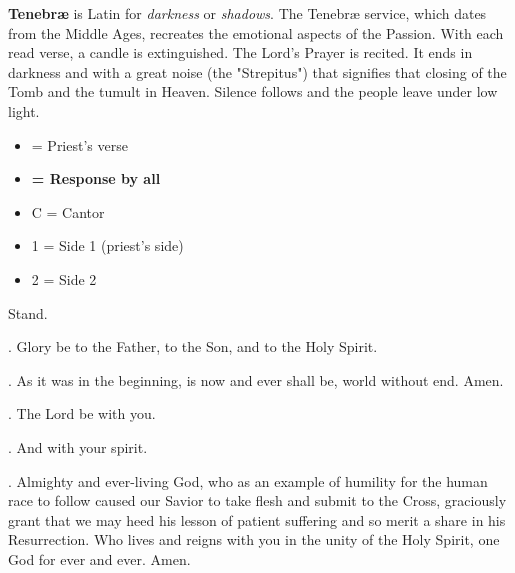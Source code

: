 
\textbf{Tenebræ} is Latin for \emph{darkness} or \emph{shadows}. The Tenebræ
service, which dates from the Middle Ages, recreates the emotional aspects of
the Passion. With each read verse, a candle is extinguished. The Lord's Prayer
is recited. It ends in darkness and with a great noise (the "Strepitus") that
signifies that closing of the Tomb and the tumult in Heaven. Silence follows
and the people leave under low light.


\begin{itemize}
  \item {\color{red} \VBar = Priest's verse}
  \item {\bf \RBar = Response by all}
  \item C = Cantor
  \item 1 = Side 1 (priest's side)
  \item 2 = Side 2
\end{itemize}


\begin{rubric}
  Stand.
\end{rubric}



\begin{versicle}
  \VBar. Glory be to the Father, to the Son, and to the Holy Spirit.
\end{versicle}

\begin{response}
  \RBar. As it was in the beginning, is now and ever shall be, world without
  end. Amen.
\end{response}

\begin{versicle}
  \VBar. The Lord be with you.
\end{versicle}

\begin{response}
  \RBar. And with your spirit.
\end{response}

\begin{versicle}
  \VBar. Almighty and ever-living God, who as an example of humility for the
  human race to follow caused our Savior to take flesh and submit to the Cross,
  graciously grant that we may heed his lesson of patient suffering and so
  merit a share in his Resurrection. Who lives and reigns with you in the unity
  of the Holy Spirit, one God for ever and ever. Amen.
\end{versicle}


